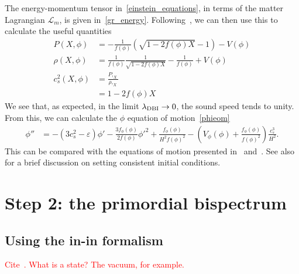 The energy-momentum tensor in~\eqref{einstein_equations}, in terms of the matter Lagrangian $\mathcal{L}_m$,
is given in~\eqref{gr_energy}.
    Following~\cite{Christopherson_2009, mukhanov_1999},
    we can then use this to calculate the useful quantities
    \begin{align}
        P(X, \phi) &= -\frac{1}{f(\phi)}\left(\sqrt{1-2f(\phi)X}-1\right)-V(\phi)\\
        \rho(X, \phi) &= \frac{1}{f(\phi)}\frac{1}{\sqrt{1-2f(\phi)X}}-\frac{1}{f(\phi)}+V(\phi)\\
        c^2_s(X, \phi) &= \frac{P,_X}{\rho,_X}\\
                    &= 1-2f(\phi)X
    \end{align}
    We see that, as expected, in the limit $\lambda_{\text{DBI}}\rightarrow 0$, the sound
    speed tends to unity.
    From this, we can calculate the $\phi$ equation of motion~\eqref{phieom}
    \begin{align}
        \phi'' &= -(3c_s^2-\varepsilon)\phi'
                -\frac{3f_\phi(\phi)}{2f(\phi)}\phi'^2
                +\frac{f_\phi(\phi)}{H^2f(\phi)^2}
                -\left(V_\phi(\phi)+\frac{f_\phi(\phi)}{f(\phi)^2}\right)\frac{c_s^3}{H^2}.
    \end{align}
    This can be compared with the equations of motion presented in~\cite{dbi_silverstein}
    and~\cite{warp_features_dbi}.
    See also~\cite{cmb_pol_ics} for a brief discussion on setting consistent initial conditions.


    \section{Step 2: the primordial bispectrum}\label{sec:inin_calc_example}
    \subsection{Using the in-in formalism}
    \textcolor{red}{
    Cite~\cite{Bartolo_review_2004, Chen_review_2010, Babich_2004, Baumann_horizon_2011,
    Renaux-Petel_2015, Meerburg_clock}.
    What is a state? The vacuum, for example.
}


